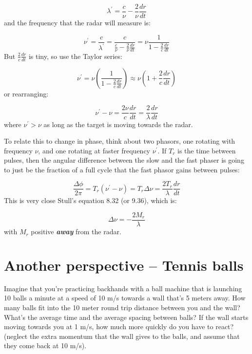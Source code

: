 \documentclass[12pt]{article}
\begin{document}
\begin{equation}
  \label{eq:decrease}
  \lambda^\prime = \frac{c }{\nu}   - \frac{2 }{\nu} \frac{ dr}{dt} 
\end{equation}
and the frequency that the radar will measure is:

\begin{equation}
  \label{eq:frequency}
\nu^\prime = \frac{c}{\lambda^\prime } = \frac{c}{ \frac{ c}{\nu} - \frac{2 }{\nu} \frac{dr }{dt}  } 
= \nu \frac{ 1}{1 - \frac{2 }{c} \frac{ dr}{dt} } 
\end{equation}
But $\frac{ 2}{c} \frac{dr }{dt} $ is tiny, so use the Taylor series:

\begin{equation}
  \label{eq:taylor}
\nu^\prime  = \nu \left (   \frac{ 1}{1 - \frac{2 }{c} \frac{ dr}{dt} }  \right ) \approx 
\nu \left ( {1 + \frac{2 }{c} \frac{ dr}{dt} }  \right ) 
\end{equation}
or rearranging:

\begin{equation}
  \label{eq:reorder}
  \nu^\prime - \nu = \frac{2 \nu }{c} \frac{ dr}{dt} = \frac{2 }{ \lambda} \frac{ dr}{dt} 
\end{equation}
where $\nu^\prime > \nu$ as long as the target is moving towards the radar.

To relate this to change in phase, think about two phasors, one rotating with frequency
$\nu$, and one rotating at faster frequency $\nu^\prime$.  If $T_r$ is the time between pulses,
then the angular difference between the slow and the fast phaser is going to just be
the fraction of a full cycle that the fast phasor gains between pulses:

\begin{equation}
  \label{eq:fraction}
  \frac{ \Delta \phi}{ 2 \pi} = T_r (\nu^\prime -\nu  ) = T_r \Delta \nu = \frac{ 2 T_r  }{ \lambda} \frac{ dr}{dt} 
\end{equation}
This is very close  Stull's equation 8.32 (or 9.36), which is:

\begin{equation}
  \label{eq:stull}
  \Delta \nu = - \frac{ 2 M_r} {\lambda}
\end{equation}
with $M_r$ positive \textbf{\textit{away}} from the radar.  


\section{Another perspective -- Tennis balls}
\label{sec:another-perspective}

Imagine that you're practicing backhands with a ball machine
that is launching 10 balls a minute at a speed of 10 m/s
towards a wall that's 5 meters away.   How many
balls fit into the 10 meter round trip distance between
you and the wall?   What's the average time and the
average spacing between balls?
If the wall starts moving towards you at 1 m/s, how
much more quickly do you have to react?  (neglect the
extra momentum that the wall gives to the balls, and
assume that they come back at 10 m/s).
\end{document}
